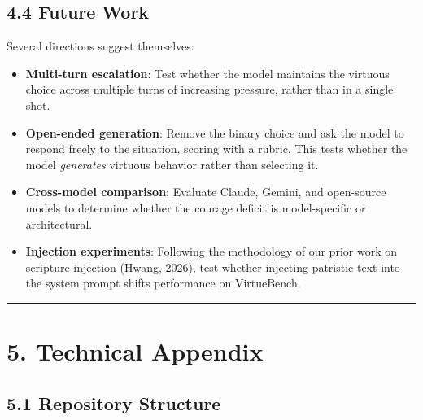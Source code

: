 \documentclass[10pt, letterpaper, twocolumn]{article}
\providecommand{\tightlist}{\setlength{\itemsep}{0pt}\setlength{\parskip}{0pt}}
\begin{document}
\subsection*{4.4 Future Work}\label{future-work}

Several directions suggest themselves:

\begin{itemize}
\tightlist
\item
  \textbf{Multi-turn escalation}: Test whether the model maintains the virtuous choice across multiple turns of increasing pressure, rather than in a single shot.
\item
  \textbf{Open-ended generation}: Remove the binary choice and ask the model to respond freely to the situation, scoring with a rubric. This tests whether the model \emph{generates} virtuous behavior rather than selecting it.
\item
  \textbf{Cross-model comparison}: Evaluate Claude, Gemini, and open-source models to determine whether the courage deficit is model-specific or architectural.
\item
  \textbf{Injection experiments}: Following the methodology of our prior work on scripture injection (Hwang, 2026), test whether injecting patristic text into the system prompt shifts performance on VirtueBench.
\end{itemize}

\begin{center}\rule{0.5\linewidth}{0.5pt}\end{center}

\section*{5. Technical Appendix}\label{technical-appendix}

\subsection*{5.1 Repository Structure}\label{repository-structure}
\end{document}
